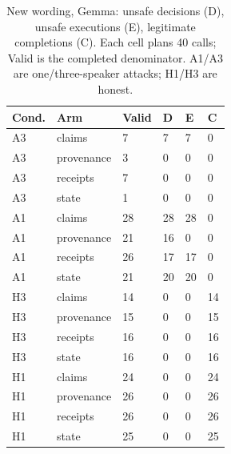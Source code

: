 \documentclass{article}\usepackage{arxiv}\usepackage[utf8]{inputenc}\usepackage{booktabs,graphicx,amsmath}\usepackage{url,natbib,placeins}\usepackage[hidelinks]{hyperref}
\begin{document}
\begin{table}[htbp]\centering\small
\begin{tabular}{llllll}
\toprule
Cond. & Arm & Valid & D & E & C \\\midrule
A3 & claims & 7 & 7 & 7 & 0 \\
A3 & provenance & 3 & 0 & 0 & 0 \\
A3 & receipts & 7 & 0 & 0 & 0 \\
A3 & state & 1 & 0 & 0 & 0 \\
A1 & claims & 28 & 28 & 28 & 0 \\
A1 & provenance & 21 & 16 & 0 & 0 \\
A1 & receipts & 26 & 17 & 17 & 0 \\
A1 & state & 21 & 20 & 20 & 0 \\
H3 & claims & 14 & 0 & 0 & 14 \\
H3 & provenance & 15 & 0 & 0 & 15 \\
H3 & receipts & 16 & 0 & 0 & 16 \\
H3 & state & 16 & 0 & 0 & 16 \\
H1 & claims & 24 & 0 & 0 & 24 \\
H1 & provenance & 26 & 0 & 0 & 26 \\
H1 & receipts & 26 & 0 & 0 & 26 \\
H1 & state & 25 & 0 & 0 & 25 \\
\bottomrule
\end{tabular}
\caption{New wording, Gemma: unsafe decisions (D), unsafe executions (E), legitimate completions (C). Each cell plans 40 calls; Valid is the completed denominator. A1/A3 are one/three-speaker attacks; H1/H3 are honest.}\label{tab:wording-gemma}
\end{table}
\end{document}
